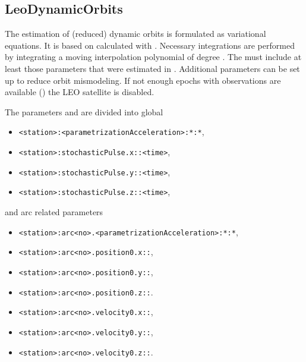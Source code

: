 \subsection{LeoDynamicOrbits}\label{gnssParametrizationType:leoDynamicOrbits}
The estimation of (reduced) dynamic orbits is formulated as variational equations.
It is based on  calculated with .
Necessary integrations are performed by integrating a moving interpolation polynomial of degree .
The  must include at least those
parameters that were estimated in .
Additional  parameters can be set up to reduce orbit mismodeling.
If not enough epochs with observations are available () the LEO satellite is disabled.

The parameters and  are divided into global
\begin{itemize}
\item \verb|<station>:<parametrizationAcceleration>:*:*|,
\item \verb|<station>:stochasticPulse.x::<time>|,
\item \verb|<station>:stochasticPulse.y::<time>|,
\item \verb|<station>:stochasticPulse.z::<time>|,
\end{itemize}
and arc related parameters
\begin{itemize}
\item \verb|<station>:arc<no>.<parametrizationAcceleration>:*:*|,
\item \verb|<station>:arc<no>.position0.x::|,
\item \verb|<station>:arc<no>.position0.y::|,
\item \verb|<station>:arc<no>.position0.z::|.
\item \verb|<station>:arc<no>.velocity0.x::|,
\item \verb|<station>:arc<no>.velocity0.y::|,
\item \verb|<station>:arc<no>.velocity0.z::|.
\end{itemize}


